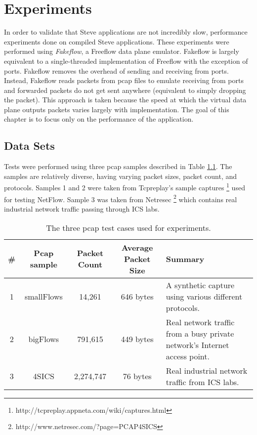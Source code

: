 \chapter{Experiments} \label{ch:experiments}

In order to validate that Steve applications are not incredibly slow, performance experiments done on compiled Steve applications. These experiments were performed using \textit{Fakeflow}, a Freeflow data plane emulator. Fakeflow is largely equivalent to a single-threaded implementation of Freeflow with the exception of ports. Fakeflow removes the overhead of sending and receiving from ports. Instead, Fakeflow reads packets from pcap files to emulate receiving from ports and forwarded packets do not get sent anywhere (equivalent to simply dropping the packet). This approach is taken because the speed at which the virtual data plane outputs packets varies largely with implementation. The goal of this chapter is to focus only on the performance of the application.

\section{Data Sets} \label{exp:use_cases}

Tests were performed using three pcap samples described in Table \ref{tbl:pcap}. 
The samples are relatively diverse, having varying packet sizes, packet count, and protocols. Samples 1 and 2 were taken from Tcpreplay's sample captures \footnote{http://tcpreplay.appneta.com/wiki/captures.html} used for testing NetFlow. Sample 3 was taken from Netresec \footnote{http://www.netresec.com/?page=PCAP4SICS} which contains real industrial network traffic passing through ICS labs.

\begin{table}
\caption{The three pcap test cases used for experiments.}
\begin{center}
\begin{tabularx}{\linewidth}{| c || c | c | c | X |}
\hline
\# & Pcap sample & Packet Count & Average Packet Size & Summary \\
\hline
1 & smallFlows & 14,261 & 646 bytes & A synthetic capture using various different protocols. \\
\hline
2 & bigFlows & 791,615 & 449 bytes & Real network traffic from a busy private network's Internet access point. \\
\hline
3 & 4SICS & 2,274,747 & 76 bytes & Real industrial network traffic from ICS labs. \\
\hline
\end{tabularx}
\end{center}
\label{tbl:pcap}
\end{table}



